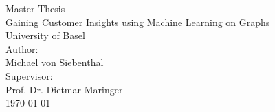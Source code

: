\documentclass[12pt]{article}
\begin{document}
  
  \begin{titlepage}
    \begin{center}
      \vspace{1em}
	  \large{Master Thesis}\\
	  \huge Gaining Customer Insights using Machine Learning on Graphs \\ 
	  \large \vspace{1em}
	  University of Basel\\
	  \vspace{4em} 
	  \large
	  Author: \\
	  Michael von Siebenthal\\
	  \vspace{2em}
	  Supervisor: \\
	  Prof. Dr. Dietmar Maringer\\
	  \vspace{2em}
	  \today
	  \vspace{3em}
    \end{center}
  \end{titlepage} 



  
  
  

  \tableofcontents
  \listoffigures
  \listoftables

  \onehalfspacing
  
  


  
  \label{section:theory}
 




   

  \appendix
  
\end{document}
